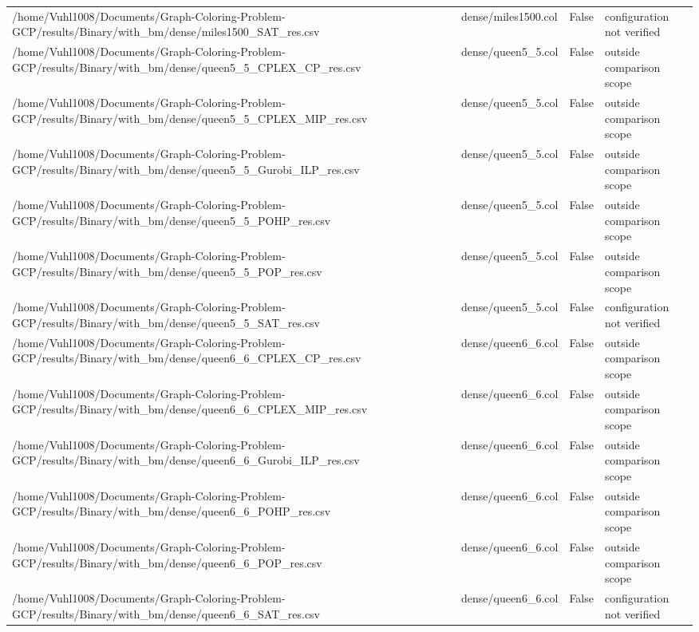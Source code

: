 \begin{table}[htbp]
\begin{tabular}{llll}
/home/Vuhl1008/Documents/Graph-Coloring-Problem-GCP/results/Binary/with\_bm/dense/miles1500\_SAT\_res.csv & dense/miles1500.col & False & configuration not verified \\
/home/Vuhl1008/Documents/Graph-Coloring-Problem-GCP/results/Binary/with\_bm/dense/queen5\_5\_CPLEX\_CP\_res.csv & dense/queen5\_5.col & False & outside comparison scope \\
/home/Vuhl1008/Documents/Graph-Coloring-Problem-GCP/results/Binary/with\_bm/dense/queen5\_5\_CPLEX\_MIP\_res.csv & dense/queen5\_5.col & False & outside comparison scope \\
/home/Vuhl1008/Documents/Graph-Coloring-Problem-GCP/results/Binary/with\_bm/dense/queen5\_5\_Gurobi\_ILP\_res.csv & dense/queen5\_5.col & False & outside comparison scope \\
/home/Vuhl1008/Documents/Graph-Coloring-Problem-GCP/results/Binary/with\_bm/dense/queen5\_5\_POHP\_res.csv & dense/queen5\_5.col & False & outside comparison scope \\
/home/Vuhl1008/Documents/Graph-Coloring-Problem-GCP/results/Binary/with\_bm/dense/queen5\_5\_POP\_res.csv & dense/queen5\_5.col & False & outside comparison scope \\
/home/Vuhl1008/Documents/Graph-Coloring-Problem-GCP/results/Binary/with\_bm/dense/queen5\_5\_SAT\_res.csv & dense/queen5\_5.col & False & configuration not verified \\
/home/Vuhl1008/Documents/Graph-Coloring-Problem-GCP/results/Binary/with\_bm/dense/queen6\_6\_CPLEX\_CP\_res.csv & dense/queen6\_6.col & False & outside comparison scope \\
/home/Vuhl1008/Documents/Graph-Coloring-Problem-GCP/results/Binary/with\_bm/dense/queen6\_6\_CPLEX\_MIP\_res.csv & dense/queen6\_6.col & False & outside comparison scope \\
/home/Vuhl1008/Documents/Graph-Coloring-Problem-GCP/results/Binary/with\_bm/dense/queen6\_6\_Gurobi\_ILP\_res.csv & dense/queen6\_6.col & False & outside comparison scope \\
/home/Vuhl1008/Documents/Graph-Coloring-Problem-GCP/results/Binary/with\_bm/dense/queen6\_6\_POHP\_res.csv & dense/queen6\_6.col & False & outside comparison scope \\
/home/Vuhl1008/Documents/Graph-Coloring-Problem-GCP/results/Binary/with\_bm/dense/queen6\_6\_POP\_res.csv & dense/queen6\_6.col & False & outside comparison scope \\
/home/Vuhl1008/Documents/Graph-Coloring-Problem-GCP/results/Binary/with\_bm/dense/queen6\_6\_SAT\_res.csv & dense/queen6\_6.col & False & configuration not verified \\

\end{tabular}
\end{table}
